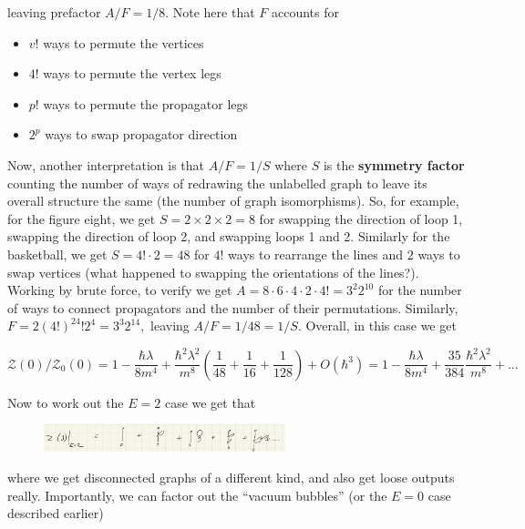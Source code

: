 \documentclass{article}
\theoremstyle{definition}
\begin{document}
leaving prefactor $A / F = 1 / 8$. Note here that $F$ accounts for

\begin{itemize}
\item $v!$ ways to permute the vertices
\item $4!$ ways to permute the vertex legs
\item $p!$ ways to permute the propagator legs
\item $2^p$ ways to swap propagator direction
\end{itemize}

Now, another interpretation is that $A / F = 1 / S$ where $S$ is the
\textbf{symmetry factor} counting the number of ways of redrawing the unlabelled
graph to leave its overall structure the same (the number of graph
isomorphisms). So, for example, for the figure eight, we get $S = 2 \times 2
\times 2 = 8$ for swapping the direction of loop 1, swapping the direction of
loop 2, and swapping loops 1 and 2. Similarly for the basketball, we get $S = 4!
\cdot 2 = 48$ for $4!$ ways to rearrange the lines and $2$ ways to swap
vertices (what happened to swapping the orientations of the lines?). Working by
brute force, to verify we get $A = 8 \cdot 6 \cdot 4 \cdot 2 \cdot 4! = 3^2
2^{10}$ for the number of ways to connect propagators and the number of their
permutations. Similarly, $F = 2(4!)^24! 2^4 = 3^3 2^{14},$ leaving $A / F = 1 /
48 = 1 / S$. Overall, in this case we get

\begin{equation}
  \mathcal{Z}(0) / \mathcal{Z}_0(0) = 1 - \frac{\hbar \lambda}{8m^4} +
  \frac{\hbar^2 \lambda^2}{m^8} \left( \frac{1}{48} + \frac{1}{16} +
    \frac{1}{128} \right) + O(\hbar^3)
  = 1 - \frac{\hbar \lambda}{8 m^4} + \frac{35}{384} \frac{\hbar^2 \lambda^2}
  {m^8} + \dots
\end{equation}

Now to work out the $E = 2$ case we get that

\begin{figure}
  \centering
  \includegraphics[width=7cm]{res/AQFT/E_2_expansion}
  \label{E_2_expansion}
\end{figure}

where we get disconnected graphs of a different kind, and also get loose outputs
really. Importantly, we can factor out the ``vacuum bubbles'' (or the $E = 0$
case described earlier)
\end{document}
